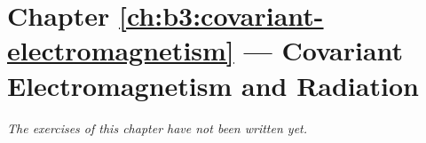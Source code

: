 \section*{Chapter \ref{ch:b3:covariant-electromagnetism} --- Covariant Electromagnetism and Radiation}


\emph{The exercises of this chapter have not been written yet.}

